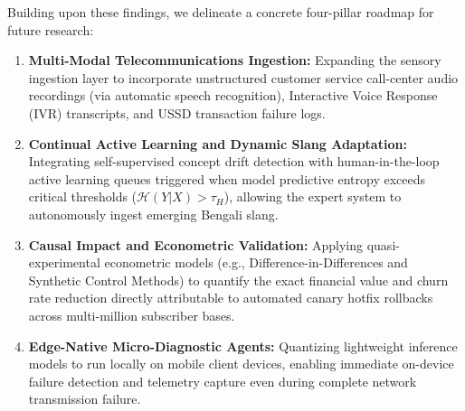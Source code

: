 \documentclass[review,12pt,authoryear]{elsarticle}
\begin{document}
Building upon these findings, we delineate a concrete four-pillar roadmap for future research:
\begin{enumerate}
    \item \textbf{Multi-Modal Telecommunications Ingestion:} Expanding the sensory ingestion layer to incorporate unstructured customer service call-center audio recordings (via automatic speech recognition), Interactive Voice Response (IVR) transcripts, and USSD transaction failure logs.
    \item \textbf{Continual Active Learning and Dynamic Slang Adaptation:} Integrating self-supervised concept drift detection with human-in-the-loop active learning queues triggered when model predictive entropy exceeds critical thresholds ($\mathcal{H}(Y|X) > \tau_H$), allowing the expert system to autonomously ingest emerging Bengali slang.
    \item \textbf{Causal Impact and Econometric Validation:} Applying quasi-experimental econometric models (e.g., Difference-in-Differences and Synthetic Control Methods) to quantify the exact financial value and churn rate reduction directly attributable to automated canary hotfix rollbacks across multi-million subscriber bases.
    \item \textbf{Edge-Native Micro-Diagnostic Agents:} Quantizing lightweight inference models to run locally on mobile client devices, enabling immediate on-device failure detection and telemetry capture even during complete network transmission failure.
\end{enumerate}



\end{document}
